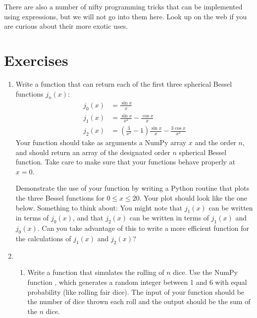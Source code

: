 \documentclass[letterpaper,10pt,english]{sphinxmanual}
\begin{document}
\sphinxAtStartPar
There are also a number of nifty programming tricks that can be implemented using  expressions, but we will not go into them here.  Look up  on the web if you are curious about their more exotic uses.

\newpage


\section{Exercises}
\label{\detokenize{chap7/chap7_funcs:exercises}}\begin{enumerate}
%
\item {} 
\sphinxAtStartPar
Write a function that can return each of the first three spherical Bessel functions \(j_n(x)\):
\begin{equation}\label{equation:chap7/chap7_funcs:eq:bessel}
\begin{split}j_0(x) &= \frac{\sin x}{x}\\
j_1(x) &= \frac{\sin x}{x^2} - \frac{\cos x}{x}\\
j_2(x) &= \left(\frac{3}{x^2}-1\right)\frac{\sin x}{x} - \frac{3\cos x}{x^2}\end{split}
\end{equation}
\sphinxAtStartPar
Your function should take as arguments a NumPy array \(x\) and the order \(n\), and should return an array of the designated order \(n\) spherical Bessel function.  Take care to make sure that your functions behave properly at \(x=0\).

\sphinxAtStartPar
Demonstrate the use of your function by writing a Python routine that plots the three Bessel functions for \(0 \le x \le 20\).  Your plot should look like the one below.  Something to think about: You might note that \(j_1(x)\) can be written in terms of \(j_0(x)\), and that \(j_2(x)\) can be written in terms of \(j_1(x)\) and \(j_0(x)\).  Can you take advantage of this to write a more efficient function for the calculations of \(j_1(x)\) and \(j_2(x)\)?

\begin{figure}[htbp]
\centering

\noindent{}
\end{figure}

\item {} \begin{enumerate}
%
\item {} 
\sphinxAtStartPar
Write a function that simulates the rolling of \(n\) dice.  Use the NumPy function , which generates a random integer between 1 and 6 with equal probability (like rolling fair dice).  The input of your function should be the number of dice thrown each roll and the output should be the sum of the \(n\) dice.


\end{enumerate}
\end{enumerate}
\end{document}
